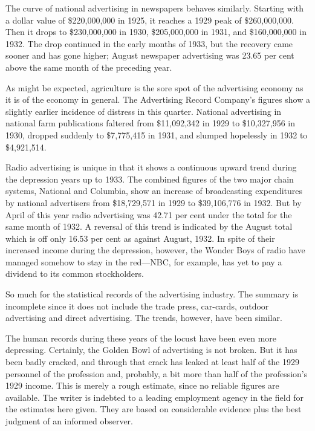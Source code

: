 \documentclass[twoside,nohyper,openany,nobib]{tufte-book}
\begin{document}
The curve of national advertising in newspapers behaves similarly.
Starting with a dollar value of \$220,000,000 in 1925, it reaches a 1929
peak of \$260,000,000. Then it drops to \$230,000,000 in 1930,
\$205,000,000 in 1931, and \$160,000,000 in 1932. The drop continued in
the early months of 1933, but the recovery came sooner and has gone
higher; August newspaper advertising was 23.65 per cent above the same
month of the preceding year.

As might be expected, agriculture is the sore spot of the advertising
economy as it is of the economy in general. The Advertising Record
Company's figures show a slightly earlier incidence of distress in this
quarter. National advertising in national farm publications faltered
from \$11,092,342 in 1929 to \$10,327,956 in 1930, dropped suddenly to
\$7,775,415 in 1931, and slumped hopelessly in 1932 to \$4,921,514.

Radio advertising is unique in that it shows a continuous upward trend
during the depression years up to 1933. The combined figures of the two
major chain systems, National and Columbia, show an increase of
broadcasting expenditures by national advertisers from \$18,729,571 in
1929 to \$39,106,776 in 1932. But by April of this year radio
advertising was 42.71 per cent under the total for the same month of
1932. A reversal of this trend is indicated by the August total which is
off only 16.53 per cent as against August, 1932. In spite of their
increased income during the depression, however, the Wonder Boys of
radio have managed somehow to stay in the red---NBC, for example, has
yet to pay a dividend to its common stockholders.

So much for the statistical records of the advertising industry. The
summary is incomplete since it does not include the trade press,
car-cards, outdoor advertising and direct advertising. The trends,
however, have been similar.

The human records during these years of the locust have been even more
depressing. Certainly, the Golden Bowl of advertising is not broken. But
it has been badly cracked, and through that crack has leaked at least
half of the 1929 personnel of the profession and, probably, a bit more
than half of the profession's 1929 income. This is merely a rough
estimate, since no reliable figures are available. The writer is
indebted to a leading employment agency in the field for the estimates
here given. They are based on considerable evidence plus the best
judgment of an informed observer.
\end{document}
